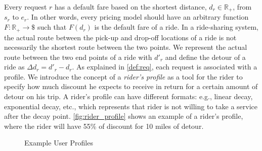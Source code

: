 Every request $r$ has a default fare based on the shortest distance, $d_r \in \mathbb{R}_{+} $, from $s_r$ to $e_r$. In other words, every pricing model should have an arbitrary function $F: \mathbb{R}_{+}  \rightarrow \$ $ such that $F(d_r)$ is the default fare of a ride. In a ride-sharing system, the actual route between the pick-up and drop-off locations of a ride is not necessarily the shortest route between the two points. We represent the actual route between the two end points of a ride with $d'_r$ and define the detour of a ride as $\Delta d_r = d'_r - d_r$. As explained in \cref{def:req}, each request is associated with a profile. We introduce the concept of a \textit{rider's profile} as a tool for the rider to specify how much discount he expects to receive in return for a certain amount of detour on his trip. A rider's profile can have different formats: e.g., linear decay, exponential decay, etc., which represents that rider is not willing to take a service after the decay point. \cref{fig:rider_profile} shows an example of a rider's profile, where the rider will have 55\% of discount for 10 miles of detour.

\begin{figure}
	\centering
	\vspace{-3mm}\caption{Example User Profiles} \vspace{-2mm} \label{fig:profiles}
\end{figure}\vspace{-0mm}

